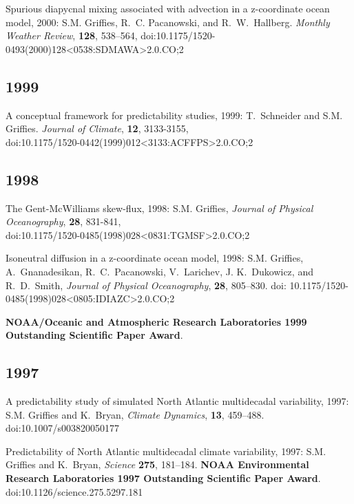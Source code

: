 \begin{etaremune}
\item Spurious diapycnal mixing associated with advection in a z-coordinate ocean model, 2000: S.M. Grif\/f\/ies, R.\ C. Pacanowski, and R.\ W.\ Hallberg. {\em Monthly Weather Review}, {\bf 128}, 538--564,
doi:10.1175/1520-0493(2000)128<0538:SDMAWA>2.0.CO;2

\subsection*{\sc \color{Maroon} 1999}

\item A conceptual framework for predictability studies, 1999: T.\  Schneider and S.M. Grif\/f\/ies.  {\em Journal of Climate}, {\bf 12}, 3133-3155, \\ doi:10.1175/1520-0442(1999)012<3133:ACFFPS>2.0.CO;2

\subsection*{\sc \color{Maroon} 1998}
  
\item The Gent-McWilliams skew-flux, 1998: S.M. Grif\/f\/ies, {\em Journal of Physical Oceanography}, {\bf 28}, 831-841, \\ doi:10.1175/1520-0485(1998)028<0831:TGMSF>2.0.CO;2

\item Isoneutral diffusion in a z-coordinate ocean model, 1998: S.M. Grif\/f\/ies, A.\ Gnanadesikan, R.\ C.\ Pacanowski, V.\ Larichev, J. K.\ Dukowicz, and R.\ D.\ Smith, {\em Journal of  Physical Oceanography}, {\bf 28}, 805--830. doi: 10.1175/1520-0485(1998)028<0805:IDIAZC>2.0.CO;2

{\bf NOAA/Oceanic and Atmospheric Research Laboratories 1999 Outstanding Scientific Paper Award}.

\subsection*{\sc \color{Maroon} 1997}
  
\item A predictability study of simulated North Atlantic multidecadal variability, 1997: S.M. Grif\/f\/ies and K.\ Bryan, {\em Climate Dynamics}, {\bf 13}, 459--488. doi:10.1007/s003820050177
  
\item Predictability of North Atlantic multidecadal climate variability, 1997: S.M. Grif\/f\/ies and K.\ Bryan, {\em Science} {\bf 275}, 181--184. {\bf NOAA Environmental Research Laboratories 1997 Outstanding Scientific Paper Award}.
doi:10.1126/science.275.5297.181


\end{etaremune}
